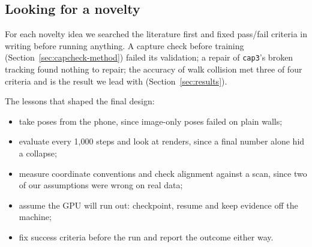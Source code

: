 \subsection{Looking for a novelty}
For each novelty idea we searched the literature first and fixed pass/fail criteria in writing before running anything. A capture check before training (Section~\ref{sec:capcheck-method}) failed its validation; a repair of \texttt{cap3}'s broken tracking found nothing to repair; the accuracy of walk collision met three of four criteria and is the result we lead with (Section~\ref{sec:results}).

The lessons that shaped the final design:
\begin{itemize}
\item take poses from the phone, since image-only poses failed on plain walls;
\item evaluate every 1,000 steps and look at renders, since a final number alone hid a collapse;
\item measure coordinate conventions and check alignment against a scan, since two of our assumptions were wrong on real data;
\item assume the GPU will run out: checkpoint, resume and keep evidence off the machine;
\item fix success criteria before the run and report the outcome either way.
\end{itemize}
